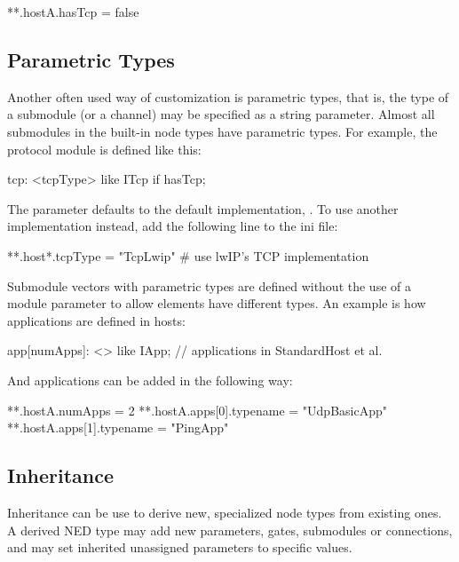 \begin{inifile}
**.hostA.hasTcp = false
\end{inifile}

\subsection*{Parametric Types}

Another often used way of customization is parametric types, that is, the
type of a submodule (or a channel) may be specified as a string parameter.
Almost all submodules in the built-in node types have parametric types.
For example, the  protocol module is defined like this:

\begin{ned}
tcp: <tcpType> like ITcp if hasTcp;
\end{ned}

The  parameter defaults to the default implementation, .
To use another implementation instead, add the following line to the ini file:
 
\begin{inifile}
**.host*.tcpType = "TcpLwip"  # use lwIP's TCP implementation
\end{inifile}

Submodule vectors with parametric types are defined without the use of a
module parameter to allow elements have different types. An example
is how applications are defined in hosts: 

\begin{ned}
app[numApps]: <> like IApp;  // applications in StandardHost et al.
\end{ned}

And applications can be added in the following way:

\begin{inifile}
**.hostA.numApps = 2
**.hostA.apps[0].typename = "UdpBasicApp"
**.hostA.apps[1].typename = "PingApp"
\end{inifile}

\subsection*{Inheritance}

Inheritance can be use to derive new, specialized node types from existing ones.
A derived NED type may add new parameters, gates, submodules or connections,
and may set inherited unassigned parameters to specific values.

